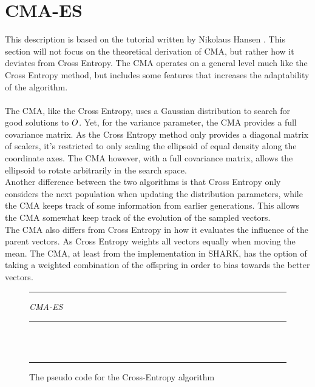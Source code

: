\section{CMA-ES \label{CMAtheory}}


This description is based on the tutorial written by Nikolaus Hansen
\citep{hansen2011}. This section will not focus on the theoretical derivation
of CMA, but rather how it deviates from Cross Entropy. 
The CMA operates on a general level much like the Cross Entropy 
method, but includes some features that increases the adaptability 
of the algorithm.\\
\\
The CMA, like the Cross Entropy, uses a Gaussian distribution to
search for good solutions to $O$. Yet, for the 
variance parameter, the CMA provides a full covariance matrix.
As the Cross Entropy method only provides a diagonal matrix of scalers,
it's restricted to only scaling the ellipsoid of equal density along
the coordinate axes. The CMA however, with a full covariance matrix,
allows the ellipsoid to rotate arbitrarily in the search space.\\
Another difference between the two algorithms is that 
Cross Entropy only considers the next population when updating the
distribution parameters, while the CMA keeps track of 
some information from earlier 
generations. This allows the CMA somewhat keep track of the evolution 
of the sampled vectors.\\
The CMA also differs from Cross Entropy in how it evaluates the influence 
of the parent vectors. As Cross Entropy weights all vectors equally when 
moving the mean. The CMA, at least from the implementation in SHARK, 
has the option of taking a weighted combination of the offspring in order
to bias towards the better vectors.

\begin{figure}[H]
\hrule
\vspace{0.2cm}
{\centering  \textit{CMA-ES}}
\vspace{0.2cm}
\hrule
\begin{algorithmic}
\\
\\
\Loop
{}
\EndLoop
\end{algorithmic}
\hrule
\caption{The pseudo code for the Cross-Entropy algorithm \label{fig:cmaCode}}
\end{figure}

